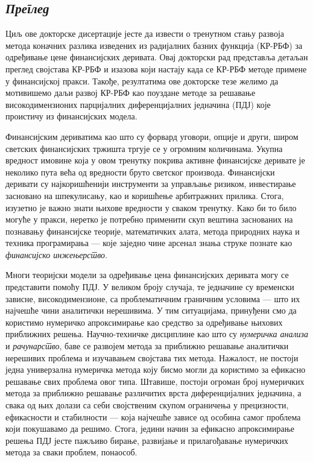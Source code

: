 \documentclass{UUThesisTemplate}
\begin{document}
\newpage
\begin{serbian}
\chapter{\emph{Преглед}}
{\noteunic
\par
\noindent Циљ ове докторске дисертације јесте да извести о тренутном стању развоја метода коначних разлика изведених из радијалних базних функција (КР-РБФ) за одређивање цене финансијских деривата. Овај докторски рад представља детаљан преглед својстава КР-РБФ и изазова који настају када се КР-РБФ методе примене у финансијској пракси. Такође, резултатима ове докторске тезе желимо да мотивишемо даљи развој КР-РБФ као поуздане методе за решавање високодимензионих парцијалних диференцијалних једначина (ПДЈ) које проистичу из финансијских модела.

\par
Финансијским дериватима као што су форвард уговори, опције и други, широм светских финансијских тржишта тргује се у огромним количинама. Укупна вредност имовине која у овом тренутку покрива активне финансијске деривате је неколико пута већа од вредности бруто светског производа. Финансијски деривати су најкоришћенији инструменти за управљање ризиком, инвестирање засновано на шпекулисању, као и коришћење арбитражних прилика. Стога, изузетно је важно знати њихове вредности у сваком тренутку. Како би то било могуће у пракси, неретко је потребно применити скуп вештина заснованих на познавању финансијске теорије, математичких алата, метода природних наука и техника програмирања --- које заједно чине арсенал знања струке познате као \emph{финансијско инжењерство}.  

\par
Многи теоријски модели за одређивање цена финансијских деривата могу се представити помоћу ПДЈ. У великом броју случаја, те једначине су временски зависне, високодимензионе, са проблематичним граничним условима --- што их најчешће чини аналитички нерешивима. У тим ситуацијама, принуђени смо да користимо нумеричко апроксимирање као средство за одређивање њихових приближних решења. Научно-техничке дисциплине као што су \emph{нумеричка анализа} и \emph{рачунарство}, баве се развојем метода за приближно решавање аналитички нерешивих проблема и изучавањем својстава тих метода. Нажалост, не постоји једна универзална нумеричка метода коју бисмо могли да користимо за ефикасно решавање свих проблема овог типа. Штавише, постоји огроман број нумеричких метода за приближно решавање различитих врста диференцијалних једначина, а свака од њих долази са себи својственим скупом ограничења у прецизности, ефикасности и стабилности --- која најчешће зависе од особина самог проблема који покушавамо да решимо. Стога, једини начин за ефикасно апроксимирање решења ПДЈ јесте пажљиво бирање, развијање и прилагођавање нумеричких метода за сваки проблем, понаособ.

}
\end{serbian}
\end{document}
